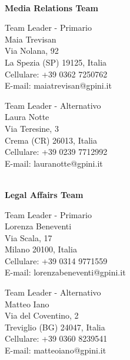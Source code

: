 \documentclass[12pt, a4paper, titlepage]{report}
\begin{document}
	\vspace{0.5cm}
	\centerline{\textbf{\\Media Relations Team}}
	\begin{paracol}{2}
		\setlength{\columnsep}{5em}
		\begin{leftcolumn}
			\begin{adjustwidth}{0.5cm}{}
				Team Leader - Primario \\
				Maia Trevisan \\
				Via Nolana, 92\\ 
				La Spezia (SP) 19125, Italia \\
				Cellulare:  +39 0362 7250762 \\
				E-mail:  maiatrevisan@gpini.it 
			\end{adjustwidth}
		\end{leftcolumn}
		\begin{rightcolumn}
			\begin{adjustwidth}{0.5cm}{}
				Team Leader - Alternativo \\
				Laura Notte\\
				Via Teresine, 3\\ 
				Crema (CR) 26013, Italia \\
				Cellulare:  +39 0239 7712992 \\
				E-mail: lauranotte@gpini.it 
			\end{adjustwidth}
		\end{rightcolumn}
	\end{paracol}
	
	\vspace{0.5cm}
	\centerline{\textbf{\\Legal Affairs Team}}
	\begin{paracol}{2}
		\setlength{\columnsep}{5em}
		\begin{leftcolumn}
			\begin{adjustwidth}{0.5cm}{}
				Team Leader - Primario \\
				Lorenza Beneventi \\
				Via Scala, 17\\ 
				Milano 20100, Italia \\
				Cellulare:  +39 0314 9771559 \\
				E-mail:  lorenzabeneventi@gpini.it 
			\end{adjustwidth}
		\end{leftcolumn}
		\begin{rightcolumn}
			\begin{adjustwidth}{0.5cm}{}
				Team Leader - Alternativo \\
				Matteo Iano\\
				Via del Coventino, 2\\ 
				Treviglio (BG) 24047, Italia \\
				Cellulare:  +39 0360 8239541 \\
				E-mail: matteoiano@gpini.it 
			\end{adjustwidth}
		\end{rightcolumn}
	\end{paracol}
	
\end{document}
